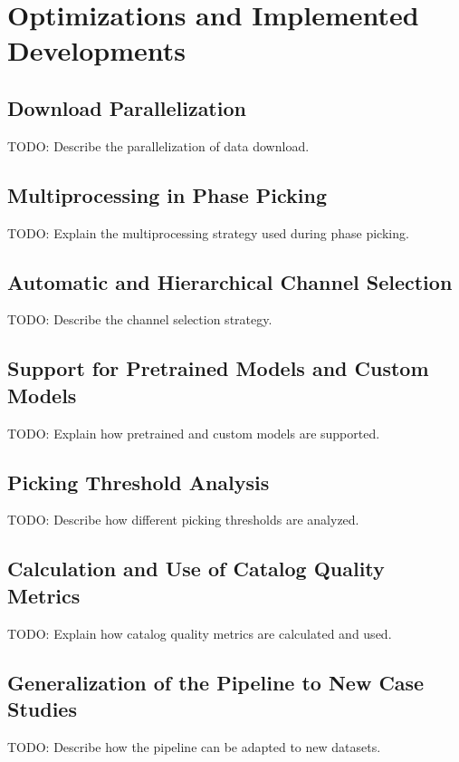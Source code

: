 \chapter{Optimizations and Implemented Developments}

\section{Download Parallelization}
TODO: Describe the parallelization of data download.

\section{Multiprocessing in Phase Picking}
TODO: Explain the multiprocessing strategy used during phase picking.

\section{Automatic and Hierarchical Channel Selection}
TODO: Describe the channel selection strategy.

\section{Support for Pretrained Models and Custom Models}
TODO: Explain how pretrained and custom models are supported.

\section{Picking Threshold Analysis}
TODO: Describe how different picking thresholds are analyzed.

\section{Calculation and Use of Catalog Quality Metrics}
TODO: Explain how catalog quality metrics are calculated and used.

\section{Generalization of the Pipeline to New Case Studies}
TODO: Describe how the pipeline can be adapted to new datasets.
